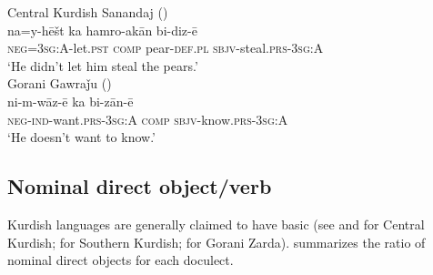 \documentclass[output=paper,colorlinks,citecolor=brown]{langscibook}
\begin{document}
\begin{sloppypar}
\ex\label{MGKC:ex:9b}
Central Kurdish Sanandaj (\citealt[B, 0278]{mohammadirad_Sanandaj_Kurdish_2022}) \\
\gll na=y-hēšt ka hamro-akān bi-diz-ē \\
\textsc{neg=3sg:A-}let\textsc{.pst} \textsc{comp} pear\textsc{-def.pl} \textsc{sbjv}-steal\textsc{.prs-3sg:A} \\
\glt `He didn't let him steal the pears.' \\
\ex\label{MGKC:ex:9c}
Gorani Gawraǰu (\citealt[424]{bailey_grammar_2018}) \\
\gll ni-m-wāz-ē ka bi-zān-ē \\
\textsc{neg-ind}-want\textsc{.prs-3sg:A} \textsc{comp} \textsc{sbjv-}know.\textsc{prs-3sg:A} \\
\glt `He doesn't want to know.'
\z
\z
\subsection{Nominal direct object/verb}
Kurdish languages are generally claimed to have basic   (see \citealt[613]{Mccarus2009}{} and \citealt[51]{Opengin2016}{} for Central Kurdish; \citealt[672]{Fattah2000}{} for Southern Kurdish; \citealt[72]{mahmoudveysi_gorani_2013}{} for Gorani Zarda).  summarizes the  ratio of nominal direct objects for each doculect.


\end{sloppypar}
\end{document}
